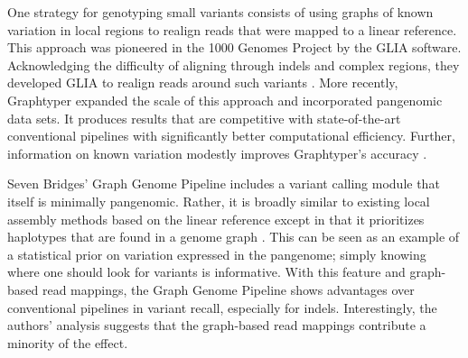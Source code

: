 

One strategy for genotyping small variants consists of using graphs of known variation in local regions to realign reads that were mapped to a linear reference.
This approach was pioneered in the 1000 Genomes Project by the GLIA software.
Acknowledging the difficulty of aligning through indels and complex regions, they developed GLIA to realign reads around such variants \cite{1000_2015}.
More recently, Graphtyper expanded the scale of this approach and incorporated pangenomic data sets.
It produces results that are competitive with state-of-the-art conventional pipelines with significantly better computational efficiency.
Further, information on known variation modestly improves Graphtyper's accuracy \cite{eggertsson2017graphtyper}.

Seven Bridges' Graph Genome Pipeline includes a variant calling module that itself is minimally pangenomic.
Rather, it is broadly similar to existing local assembly methods based on the linear reference \cite{Poplin_2017, Rimmer_2014} except in that it prioritizes haplotypes that are found in a genome graph \cite{Rakocevic_2019}.
This can be seen as an example of a statistical prior on variation expressed in the pangenome; simply knowing where one should look for variants is informative.
With this feature and graph-based read mappings, the Graph Genome Pipeline shows advantages over conventional pipelines in variant recall, especially for indels.
Interestingly, the authors' analysis suggests that the graph-based read mappings contribute a minority of the effect.

%

